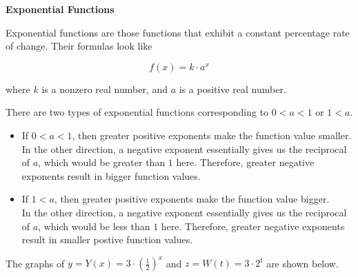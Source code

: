 \documentclass{ximera}
\begin{document}
\begin{definition} \textbf{\textcolor{green!50!black}{Exponential Functions}}

Exponential functions are those functions that exhibit a constant percentage rate of change.  Their formulas look like


\[      f(x) = k \cdot a^x   \]

where $k$ is a nonzero real number, and $a$ is a positive real number.


\end{definition}


There are two types of exponential functions corresponding to $0<a<1$ or $1<a$.






\begin{itemize}
\item If $0<a<1$, then greater positive exponents make the function value smaller.   \\
In the other direction, a negative exponent essentially gives us the reciprocal of $a$, which would be greater than $1$ here.  Therefore, greater negative exponents result in bigger function values. \\

\item If $1<a$, then greater positive exponents make the function value bigger.   \\ 
In the other direction, a negative exponent essentially gives us the reciprocal of $a$, which would be less than $1$ here.  Therefore, greater negative exponents result in smaller postive function values.
\end{itemize}



The graphs of $y = Y(x) = 3 \cdot \left(\frac{1}{2}\right)^x$ and $z = W(t) = 3 \cdot 2^t$ are shown below.
\end{document}
